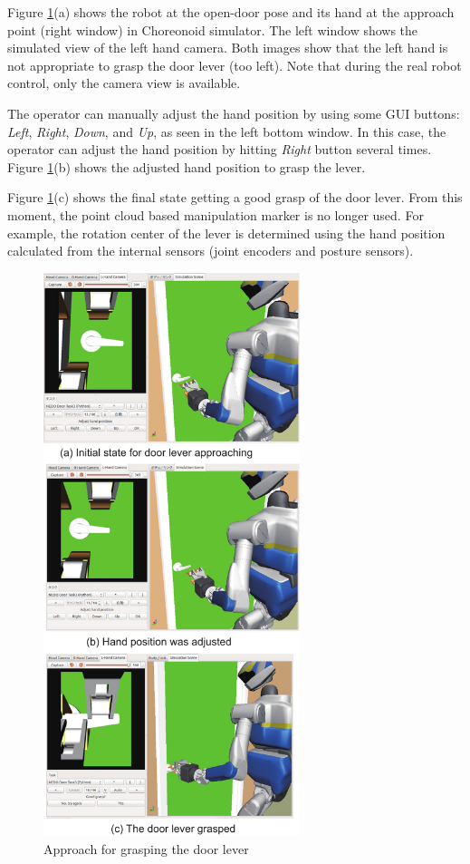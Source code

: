 Figure \ref{fig:door_lever_grasp}(a) shows the robot at the open-door pose and its hand at the
approach point (right window) in Choreonoid simulator.
The left window shows the simulated view of the left hand camera.
Both images show that the left hand is not appropriate to grasp the door lever (too left).
Note that during the real robot control, only the camera view is available. 

The operator can manually adjust the hand position by using some GUI buttons: 
{\it Left}, {\it Right}, {\it Down}, and {\it Up}, as seen in the left bottom window.
In this case, the operator can adjust the hand position by hitting {\it Right} button
several times.
Figure \ref{fig:door_lever_grasp}(b) shows the adjusted hand position to grasp the lever.

Figure \ref{fig:door_lever_grasp}(c) shows the final state getting a good grasp of the door lever.
From this moment, the point cloud based manipulation marker is no longer used.
For example, the rotation center of the lever is determined using the hand position calculated from
the internal sensors (joint encoders and posture sensors). 
%
\begin{figure}[t]
  \centering
  \includegraphics[width = 7.5cm]{img/approach_door_lever}
  \caption{Approach for grasping the door lever}
  \label{fig:door_lever_grasp}
\end{figure}

